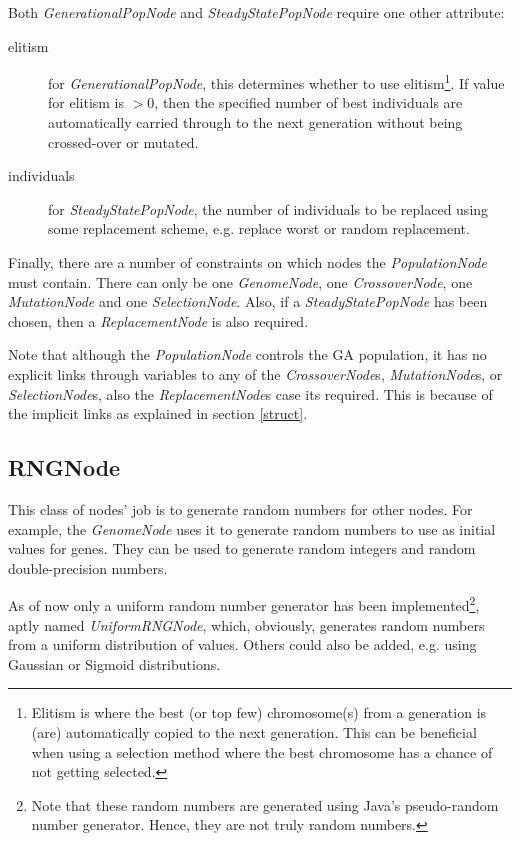 \documentclass[10pt, notitlepage, a4paper]{article}
\begin{document}
Both {\it GenerationalPopNode} and {\it SteadyStatePopNode} require one other attribute:
\begin{description}
\item[elitism] for {\it GenerationalPopNode}, this determines whether to use elitism\footnote{Elitism is where the best (or top few) chromosome(s) from a generation is (are) automatically copied to the next generation. This can be beneficial when using a selection method where the best chromosome has a chance of not getting selected.}. If value for elitism is $>0$, then the specified number of best individuals are automatically carried through to the next generation without being crossed-over or mutated.
\item[individuals] for {\it SteadyStatePopNode}, the number of individuals to be replaced using some replacement scheme, e.g. replace worst or random replacement.
\end{description}

Finally, there are a number of constraints on which nodes the {\it PopulationNode} must contain. There can only be one {\it GenomeNode}, one {\it CrossoverNode}, one {\it MutationNode} and one {\it SelectionNode}. Also, if a {\it SteadyStatePopNode} has been chosen, then a {\it ReplacementNode} is also required.

Note that although the {\it PopulationNode} controls the GA population, it has no explicit links through variables to any of the {\it CrossoverNode}s, {\it MutationNode}s, or {\it SelectionNode}s, also the {\it ReplacementNode}s case its required. This is because of the implicit links as explained in section \ref{struct}.

\subsection{RNGNode}
This class of nodes' job is to generate random numbers for other nodes. For example, the {\it GenomeNode} uses it to generate random numbers to use as initial values for genes. They can be used to generate random integers and random double-precision numbers.

As of now only a uniform random number generator has been implemented\footnote{Note that these random numbers are generated using Java's pseudo-random number generator. Hence, they are not truly random numbers.}, aptly named  {\it UniformRNGNode}, which, obviously, generates random numbers from a uniform distribution of values. Others could also be added, e.g. using Gaussian or Sigmoid distributions.
\end{document}

